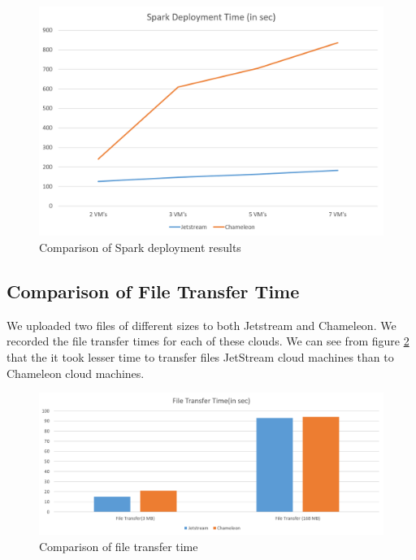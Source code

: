 \documentclass[9pt,twocolumn,twoside]{../../styles/osajnl}
\begin{document}
\begin{figure}[h]
	\centering
	\includegraphics[width=\linewidth,scale=1]{images/spdeploymenttime.png}
	\caption{Comparison of Spark deployment results}
	\label{fig:spd}
\end{figure}

\subsection{Comparison of File Transfer Time}

We uploaded two files of different sizes to both Jetstream and Chameleon. We recorded the file transfer times for each of these clouds. We can see from figure \ref{fig:ftt} that the it took lesser time to transfer files JetStream cloud machines than to Chameleon cloud machines.

\begin{figure}[h]
	\centering
	\includegraphics[width=\linewidth,scale=1]{images/Filetransfer.png}
	\caption{Comparison of file transfer time}
	\label{fig:ftt}
\end{figure}
\end{document}
